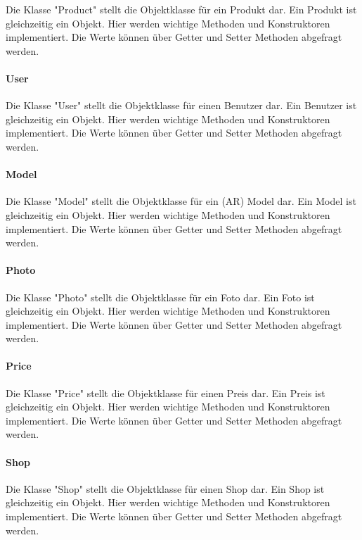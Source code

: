 \documentclass{scrartcl}
\begin{document}
Die Klasse "Product" stellt die Objektklasse für ein Produkt dar. Ein Produkt ist gleichzeitig ein Objekt. Hier werden wichtige Methoden und Konstruktoren implementiert. Die Werte können über Getter und Setter Methoden abgefragt werden.

\paragraph{User}

Die Klasse "User" stellt die Objektklasse für einen Benutzer dar. Ein Benutzer ist gleichzeitig ein Objekt. Hier werden wichtige Methoden und Konstruktoren implementiert. Die Werte können über Getter und Setter Methoden abgefragt werden.

\paragraph{Model}

Die Klasse "Model" stellt die Objektklasse für ein (AR) Model dar. Ein Model ist gleichzeitig ein Objekt. Hier werden wichtige Methoden und Konstruktoren implementiert. Die Werte können über Getter und Setter Methoden abgefragt werden.

\paragraph{Photo}

Die Klasse "Photo" stellt die Objektklasse für ein Foto dar. Ein Foto ist gleichzeitig ein Objekt. Hier werden wichtige Methoden und Konstruktoren implementiert. Die Werte können über Getter und Setter Methoden abgefragt werden.

\paragraph{Price}

Die Klasse "Price" stellt die Objektklasse für einen Preis dar. Ein Preis ist gleichzeitig ein Objekt. Hier werden wichtige Methoden und Konstruktoren implementiert. Die Werte können über Getter und Setter Methoden abgefragt werden.

\paragraph{Shop}

Die Klasse "Shop" stellt die Objektklasse für einen Shop dar. Ein Shop ist gleichzeitig ein Objekt. Hier werden wichtige Methoden und Konstruktoren implementiert. Die Werte können über Getter und Setter Methoden abgefragt werden.
\end{document}
